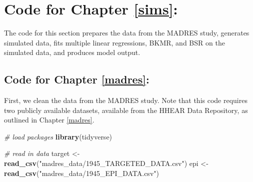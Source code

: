 \documentclass[12pt, twoside]{amherstthesis}
\newenvironment{Shaded}{\begin{snugshade}}{\end{snugshade}}
\newcommand{\CommentTok}[1]{\textcolor[rgb]{0.56,0.35,0.01}{\textit{#1}}}
\newcommand{\FunctionTok}[1]{\textcolor[rgb]{0.13,0.29,0.53}{\textbf{#1}}}
\newcommand{\NormalTok}[1]{#1}
\newcommand{\OtherTok}[1]{\textcolor[rgb]{0.56,0.35,0.01}{#1}}
\newcommand{\StringTok}[1]{\textcolor[rgb]{0.31,0.60,0.02}{#1}}
\begin{document}
\hypertarget{code-for-chapter-refsims}{%
\section{Code for Chapter \ref{sims}:}\label{code-for-chapter-refsims}}

The code for this section prepares the data from the MADRES study, generates simulated data, fits multiple linear regressions, BKMR, and BSR on the simulated data, and produces model output.

\hypertarget{code-for-chapter-refmadres}{%
\subsection{Code for Chapter \ref{madres}:}\label{code-for-chapter-refmadres}}

First, we clean the data from the MADRES study. Note that this code requires two publicly available datasets, available from the HHEAR Data Repository, as outlined in Chapter \ref{madres}.

\scriptsize
\begin{Shaded}
\begin{Highlighting}[]
\CommentTok{\# load packages}
\FunctionTok{library}\NormalTok{(tidyverse)}
\end{Highlighting}
\end{Shaded}
\normalsize

\scriptsize
\begin{Shaded}
\begin{Highlighting}[]
\CommentTok{\# read in data}
\NormalTok{target }\OtherTok{\textless{}{-}} \FunctionTok{read\_csv}\NormalTok{(}\StringTok{"madres\_data/1945\_TARGETED\_DATA.csv"}\NormalTok{)}
\NormalTok{epi }\OtherTok{\textless{}{-}} \FunctionTok{read\_csv}\NormalTok{(}\StringTok{"madres\_data/1945\_EPI\_DATA.csv"}\NormalTok{)}
\end{Highlighting}
\end{Shaded}
\normalsize
\end{document}
